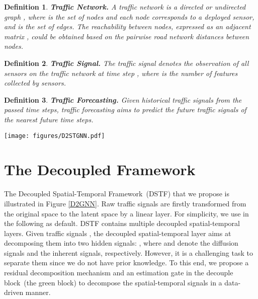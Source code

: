 \documentclass[sigconf, nonacm]{acmart}
\newtheorem{definition}{Definition}
\begin{document}
\begin{definition}
\textbf{Traffic Network.} 
A traffic network is a directed or undirected graph , where  is the set of  nodes and each node corresponds to a deployed sensor, {\color{black}and}  is the set of  edges. 
The reachability between nodes, expressed as an adjacent matrix , could be obtained based on the pairwise road network distances between nodes.
\end{definition}
\begin{definition}
\textbf{Traffic Signal.} 
The traffic signal  denotes the observation of all sensors on the traffic network  at time step , where {\color{black} is the number of features collected by sensors}.
\end{definition}
\begin{definition}
\textbf{Traffic Forecasting.}
Given historical traffic signals  from the passed  time steps, traffic forecasting aims to predict the future traffic signals  of the  nearest future time steps.
\end{definition}

 \begin{figure*}[ht]
  \centering
\texttt{[image: figures/D2STGNN.pdf]}
  \caption{
The overall architecture of {\color{black}the proposed DSTGNN.
The decouple block~(green) decomposes each time series in traffic signals into two hidden time series, which are subsequently handled by the diffusion block~(pink) and inherent block~(blue). 
Moreover, the dynamic graph learning module generates dynamic spatial dependency for the diffusion model.}
}

  \label{D2GNN}
\end{figure*}
\section{The Decoupled Framework}
\label{Section4}
The Decoupled Spatial-Temporal Framework~{\color{black}(DSTF)} that we propose is illustrated in Figure \ref{D2GNN}.
{\color{black}
Raw traffic signals are firstly transformed from the original space  to the latent space  by a linear layer.
For simplicity, we use  in the following as default.}
{\color{black} DSTF contains multiple decoupled spatial-temporal layers.
Given traffic signals ,
the decoupled spatial-temporal layer aims at decomposing them into two hidden signals: , 
where  and  denote the diffusion signals and the inherent signals, respectively. 
However, it is a challenging task to separate them since we do not have prior knowledge.
}
{\color{black}To this end}, we propose a residual decomposition mechanism and an {\color{black}estimation} gate {\color{black}in the decouple block~(the green block) to decompose the spatial-temporal signals in a data-driven manner}.
\end{document}

